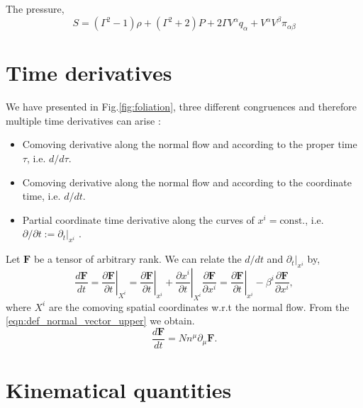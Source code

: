 The pressure,
\begin{equation}
    S=(\Gamma^2-1)\rho + (\Gamma^2+2)P+2\Gamma V^\alpha q_\alpha + V^\alpha V^\beta \pi_{\alpha\beta}
    \label{eqn:general_shear_fluid_normal}
\end{equation}

\section{Time derivatives}


We have presented in Fig.\eqref{fig:foliation}, three different congruences and therefore multiple time derivatives can arise \cite{Buchert_2020}:
\begin{itemize}
    \item Comoving derivative along the normal flow and according to the proper time $\tau$, i.e. $d/d\tau$.
    \item Comoving derivative along the normal flow and according to the coordinate time, i.e. $d/dt$.
    \item Partial coordinate time derivative along the curves of $x^i=\text{const.}$, i.e. $\partial/\partial t:=\partial_t|_{x^i}$ .
\end{itemize}

Let $\mathbf{F}$ be a tensor of arbitrary rank. We can relate the $d/dt$ and $\partial_t|_{x^i}$ by,
\begin{equation}
    \frac{d\mathbf{F}}{dt}=\left.\frac{\partial \mathbf{F}}{\partial t}\right|_{X^i}=\left.\frac{\partial \mathbf{F}}{\partial t}\right|_{x^i}+\left.\frac{\partial x^i}{\partial t}\right|_{X^i}\frac{\partial \mathbf{F}}{\partial x^i}=\left.\frac{\partial \mathbf{F}}{\partial t}\right|_{x^i}-\beta^i\frac{\partial \mathbf{F}}{\partial x^i},
    \label{eqn:total_time_expression}
\end{equation}
where $X^i$ are the comoving spatial coordinates w.r.t the normal flow. From the \cref{eqn:def_normal_vector_upper} we obtain.
\begin{equation}
    \frac{d\mathbf{F}}{dt}=Nn^\mu\partial_\mu \mathbf{F}.
    \label{eqn:relation_total_time_normal_vec}
\end{equation}



\section{Kinematical quantities}



